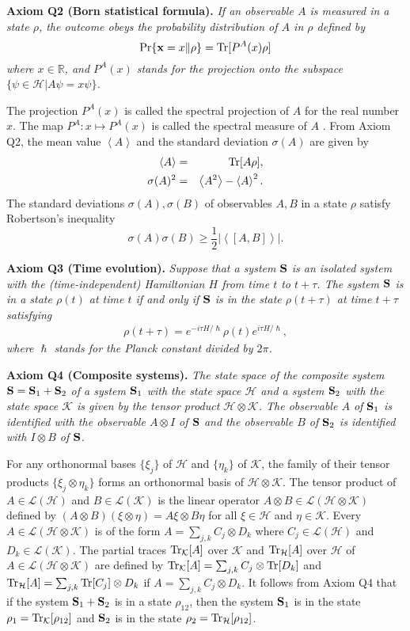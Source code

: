 \documentclass[12pt]{article}
\newcommand{\beq}{\begin{equation}}
\newcommand{\eeq}{\end{equation}}
\newcommand{\beql}[1]{\begin{equation}\label{eq:#1}}
\newcommand{\beqa}{\begin{eqnarray}}
\newcommand{\eeqa}{\end{eqnarray}}
\newcommand{\bS}{{\bf S}}
\newcommand{\cH}{{\mathcal H}}
\newcommand{\cK}{{\mathcal K}}
\newcommand{\cL}{{\mathcal L}}
\newcommand{\et}{\eta}
\def\ps{\psi}
\newcommand{\rh}{\rho}
\newcommand{\si}{\sigma}
\newcommand{\ta}{\tau}
\newcommand{\Tr}{\mbox{\rm Tr}}
\newcommand{\bx}{{\bf x}}
\newcommand{\R}{\mathbb{R}}
\newcommand{\bracket}[1]{\left\langle#1\right\rangle}
\begin{document}
{\bf Axiom Q2 (Born statistical formula).}
{\em If an observable $A$ is measured in a state $\rho$, 
the outcome obeys the probability distribution
of $A$ in $\rho$ defined by
\beq
\Pr\{\bx=x\|\rh\}=\Tr[P^{A}(x)\rh]
\eeq
where $x\in\R$, and $P^{A}(x)$ stands for the projection 
onto the subspace $\{\ps\in\cH| A\ps=x\ps\}$.}
\bigskip


The projection $P^{A}(x)$ is called the spectral projection of $A$
for the real number $x$.
The map $P^{A}:x\mapsto P^{A}(x)$ is called the 
spectral measure of $A$ \cite{Hal51}.
From Axiom Q2, the mean value  $\bracket{A}$
and the standard deviation $\si(A)$ are given by
\beqa
\bracket{A}&=&\Tr[A\rh],\\
\si(A)^2&=&\bracket{A^2}-\bracket{A}^2.
\eeqa
The standard deviations $\si(A),\si(B)$
of observables $A,B$ in a state $\rh$ satisfy 
Robertson's inequality
\beql{URSP}
\si(A)\si(B)\ge\frac{1}{2}|\bracket{[A,B]}|.
\eeq
\bigskip

{\bf Axiom Q3 (Time evolution).}
{\em Suppose that a system $\bS$ is an isolated system with the (time-independent)
Hamiltonian $H$ from time $t$ to $t+\ta$.
The system $\bS$ is in a state  $\rh(t)$ at time $t$ if and only if\/ $\bS$ is in the
state $\rh(t+\ta)$ at time $t+\ta$ satisfying
\beqa
\rh(t+\ta)=e^{-i\ta H/\hslash}\rh(t)e^{i\ta H/\hslash},
\eeqa
where $\hslash$ stands for the Planck constant divided by $2\pi$.}
\bigskip

{\bf Axiom Q4 (Composite systems).}
{\em The state space of the composite system $\bS=\bS_{1}+\bS_{2}$ 
of a system $\bS_{1}$ with the
state space $\cH$ and a system  $\bS_{2}$ with the
state space $\cK$ is given by the tensor product 
$\cH\otimes\cK$.  The observable $A$ of\/ $\bS_1$
is identified with the observable  $A\otimes I$  of\/ $\bS$ and 
the observable $B$ of\/ $\bS_2$ is identified with 
 $I\otimes B$ of \/ $\bS$.}
\bigskip

For any orthonormal bases $\{\xi_j\}$ of $\cH$ and $\{\et_k\}$ of $\cK$, 
the family of their tensor products
$\{\xi_j\otimes\et_k\}$ forms an orthonormal basis of $\cH\otimes\cK$.
The tensor product of $A\in\cL(\cH)$ and  $B\in\cL(\cK)$ is the linear operator 
$A\otimes B\in\cL(\cH\otimes\cK)$ defined by 
$(A\otimes B)(\xi\otimes \et)=A\xi\otimes B\et$ for all $\xi\in\cH$ and $\et\in\cK$.
Every $A\in \cL(\cH\otimes\cK)$ is of the form $A=\sum_{j,k}C_j\otimes D_k$
where $C_j\in\cL(\cH)$ and $D_k\in\cL(\cK)$.
The partial traces $\Tr_{\cK}[A]$ over $\cK$ and $\Tr_{\cH}[A]$ over $\cH$ 
of $A\in\cL(\cH\otimes \cK)$ 
are defined by $\Tr_{\cK}[A]=\sum_{j,k}C_j\otimes \Tr[D_k]$ and
$\Tr_{\cH}[A]=\sum_{j,k}\Tr[C_j]\otimes D_k$  if
$A=\sum_{j,k}C_j\otimes D_k$.
It follows from Axiom Q4 that 
if the system $\bS_{1}+\bS_{2}$ is in a state $\rh_{12}$, then the system
$\bS_{1}$ is in the state $\rh_{1}=\Tr_{\cK}[\rh_{12}]$  and $\bS_{2}$ is in the state 
$\rh_{2}=\Tr_{\cH}[\rh_{12}]$.
\end{document}
